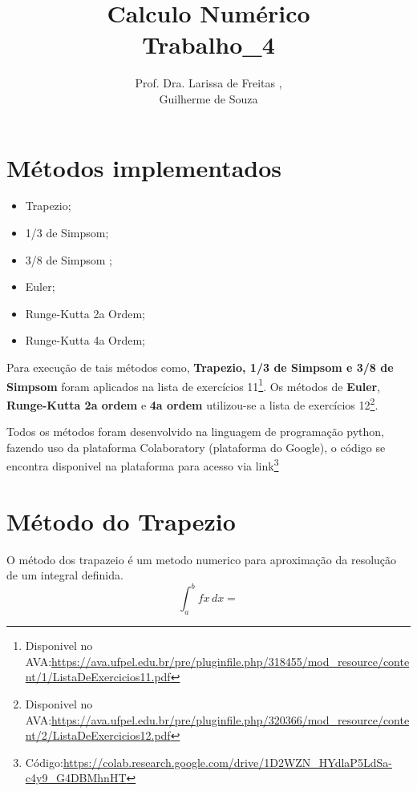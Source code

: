 \documentclass[12pt]{article}
\title{Calculo Numérico\\Trabalho\_4}
\author{Prof. Dra. Larissa de Freitas \inst{1},\\Guilherme de Souza\inst{1}}
\begin{document}
 

\maketitle
\br

\section{Métodos implementados}
\begin{itemize}
  \item Trapezio;
  \item 1/3 de Simpsom;
  \item 3/8 de Simpsom ;
  \item Euler;
  \item Runge-Kutta 2a Ordem;
  \item Runge-Kutta 4a Ordem;
\end{itemize}

Para execução de tais métodos como, \textbf{Trapezio, 1/3 de Simpsom e 3/8 de Simpsom} foram aplicados na lista de exercícios 11\footnote{Disponivel no AVA:\url{https://ava.ufpel.edu.br/pre/pluginfile.php/318455/mod_resource/content/1/ListaDeExercicios11.pdf}}. Os métodos de \textbf{Euler}, \textbf{Runge-Kutta 2a ordem} e \textbf{4a ordem} utilizou-se a lista de exercícios 12\footnote{Disponivel no AVA:\url{https://ava.ufpel.edu.br/pre/pluginfile.php/320366/mod_resource/content/2/ListaDeExercicios12.pdf}}.


Todos os métodos foram desenvolvido na linguagem de programação python, fazendo uso da plataforma Colaboratory (plataforma do Google), o código se encontra disponivel na plataforma para acesso via link\footnote{Código:\url{https://colab.research.google.com/drive/1D2WZN_HYdlaP5LdSa-c4y9_G4DBMhnHT}}

\section{Método do Trapezio}
 O método dos trapazeio é um metodo numerico para aproximação da resolução de um integral definida.
 \[\int_{a}^{b} \! fx \, dx = \]
\end{document}
